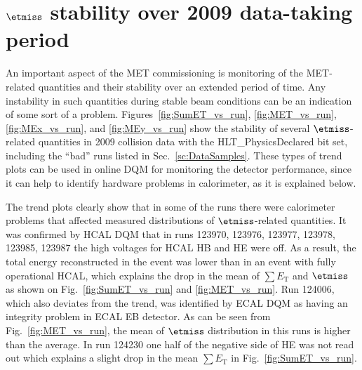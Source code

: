 \section{$\etmiss$ stability over 2009 data-taking period}
\label{sc:METStab}

An important aspect of the MET commissioning is monitoring of the
MET-related quantities and their stability over an extended period of
time. Any instability in such quantities during stable beam conditions
can be an indication of some sort of a problem.
Figures~\ref{fig:SumET_vs_run}, \ref{fig:MET_vs_run},
\ref{fig:MEx_vs_run}, and \ref{fig:MEy_vs_run} show the stability of
several $\etmiss$-related quantities in 2009 collision data with the
HLT\_PhysicsDeclared bit set, including the ``bad'' runs listed in
Sec.~\ref{sc:DataSamples}. These types of trend plots can be used in online DQM
for monitoring the detector performance, since it can help to identify
hardware problems in calorimeter, as it is explained below.

The trend plots clearly show that in some of the runs there
were calorimeter problems that affected measured distributions 
of $\etmiss$-related quantities. It was
confirmed by HCAL DQM that in runs 123970, 123976, 123977,
123978, 123985, 123987 the high voltages for HCAL HB and HE were off. As
a result, the total energy reconstructed in the event was lower than in
an event with fully operational HCAL, which explains the drop in
the mean of $\sum E_\text{T}$ and $\etmiss$ as shown on
Fig.~\ref{fig:SumET_vs_run} and \ref{fig:MET_vs_run}. Run 124006, which
also deviates from the trend, was identified by ECAL DQM as having an
integrity problem in ECAL EB detector. As can be seen from
Fig.~\ref{fig:MET_vs_run}, the mean of $\etmiss$
distribution in this runs is higher than the average. In run 124230 one half
of the negative side of HE was not read out which explains a slight drop in
the mean $\sum E_\text{T}$ in Fig.~\ref{fig:SumET_vs_run}.

